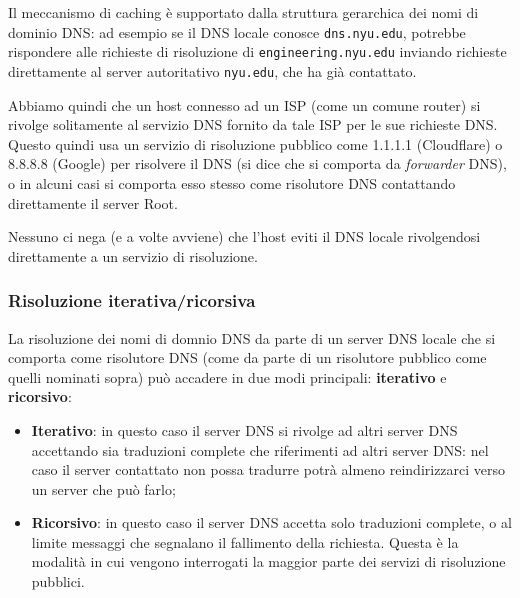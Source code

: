 \documentclass[a4paper,11pt]{article}
\begin{document}
Il meccanismo di caching è supportato dalla struttura gerarchica dei nomi di dominio DNS: ad esempio se il DNS locale conosce \lstinline|dns.nyu.edu|, potrebbe rispondere alle richieste di risoluzione di \lstinline|engineering.nyu.edu| inviando richieste direttamente al server autoritativo \lstinline|nyu.edu|, che ha già contattato.

Abbiamo quindi che un host connesso ad un ISP (come un comune router) si rivolge solitamente al servizio DNS fornito da tale ISP per le sue richieste DNS.
Questo quindi usa un servizio di risoluzione pubblico come 1.1.1.1 (Cloudflare) o 8.8.8.8 (Google) per risolvere il DNS (si dice che si comporta da \textit{forwarder} DNS), o in alcuni casi si comporta esso stesso come risolutore DNS contattando direttamente il server Root.

Nessuno ci nega (e a volte avviene) che l'host eviti il DNS locale rivolgendosi direttamente a un servizio di risoluzione.

\subsubsection{Risoluzione iterativa/ricorsiva}
La risoluzione dei nomi di domnio DNS da parte di un server DNS locale che si comporta come risolutore DNS (come da parte di un risolutore pubblico come quelli nominati sopra) può accadere in due modi principali: \textbf{iterativo} e \textbf{ricorsivo}:
\begin{itemize}
	\item \textbf{Iterativo}: in questo caso il server DNS si rivolge ad altri server DNS accettando sia traduzioni complete che riferimenti ad altri server DNS: nel caso il server contattato non possa tradurre potrà almeno reindirizzarci verso un server che può farlo;
	\item \textbf{Ricorsivo}: in questo caso il server DNS accetta solo traduzioni complete, o al limite messaggi che segnalano il fallimento della richiesta.
		Questa è la modalità in cui vengono interrogati la maggior parte dei servizi di risoluzione pubblici.
\end{itemize}
\end{document}
